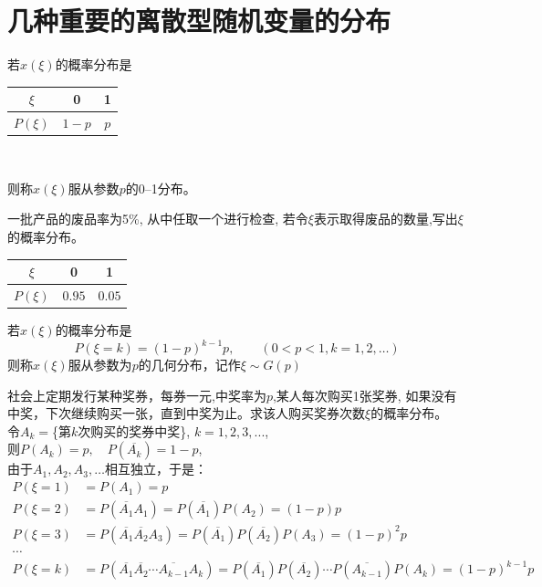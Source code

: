 \documentclass[xcolor=svgnames,serif,table,10pt]{beamer}
\begin{document}
\section{几种重要的离散型随机变量的分布}
\begin{frame}
\begin{definition}[0--1分布]
	若$x(\xi)$的概率分布是\\
	\begin{center}
	\begin{tabular}{|c|c|c|}
		\hline 
		$\xi$ & 0 & 1\\ 
		\hline 
		$P(\xi)$ & $1-p$ & $p$\\ 
		\hline 
	\end{tabular} \\
	\end{center}
	则称$x(\xi)$服从参数$p$的0--1分布。
\end{definition}
\begin{example}
	一批产品的废品率为5\%, 从中任取一个进行检查, 若令$\xi$表示取得废品的数量,写出$\xi$的概率分布。\\
	\begin{tabular}{|c|c|c|}
		\hline 
		$\xi$ & 0 & 1\\ 
		\hline 
		$P(\xi)$ & $0.95$ & $0.05$\\ 
		\hline 
	\end{tabular} 
\end{example}
\end{frame}
\begin{frame}
\begin{definition}[几何分布]
	若$x(\xi)$的概率分布是
	\[P(\xi=k)=(1-p)^{k-1}p,\qquad (0<p<1,k=1,2,\dots)\]
	则称$x(\xi)$服从参数为$p$的几何分布，记作$\xi\sim G(p)$
\end{definition}
\end{frame}

\begin{frame}
\begin{example}
	社会上定期发行某种奖券，每券一元,中奖率为$p$,某人每次购买1张奖券, 如果没有中奖，下次继续购买一张，直到中奖为止。求该人购买奖券次数$\xi$的概率分布。\\
	令$A_k=$\{第$k$次购买的奖券中奖\}, $k=1,2,3,...$, \\
	则$P(A_k)=p,\quad P(\overline{A_k})=1-p$, \\
	由于$A_1,A_2,A_3,\dots$相互独立，于是：
	\begin{align*}
	P(\xi=1)&=P(A_1)=p\\
	P(\xi=2)&=P(\overline{A_1}A_1)=P(\overline{A_1})P(A_2)=(1-p)p\\
	P(\xi=3)&=P(\overline{A_1}\overline{A_2}A_3)=P(\overline{A_1})P(\overline{A_2})P(A_3)=(1-p)^{2}p\\
	\cdots\\
	P(\xi=k)&=P(\overline{A_1}\overline{A_2}\cdots\overline{A_{k-1}}A_k)=P(\overline{A_1})P(\overline{A_2})\cdots P(\overline{A_{k-1}})P(A_k)=(1-p)^{k-1}p
	\end{align*}
\end{example}
\end{frame}
\end{document}
